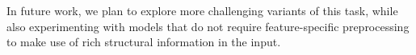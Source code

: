 \documentclass[11pt,a4paper]{article}
\begin{document}
In future work, we plan to explore more challenging variants of this task, while also experimenting with models that do not require feature-specific preprocessing to make use of rich structural information in the input. 






%
%


\end{document}
